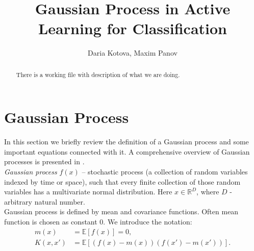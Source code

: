 \documentclass[a4paper]{article}
\title{Gaussian Process in Active Learning for Classification}
\author{Daria Kotova, Maxim Panov}
\begin{document}
\maketitle

\setlength{\marginparwidth}{2cm}

\begin{abstract}

There is a working file with description of what we are doing.

\end{abstract}

\section{Gaussian Process}

In this section we briefly review the definition of a Gaussian process and some important equations connected with it. A comprehensive overview of Gaussian processes is presented in \cite{gp}. \\
{\em  Gaussian process} $f\left(x\right)$ -- stochastic process (a collection of random variables indexed by time or space), such that every finite collection of those random variables has a multivariate normal distribution. Here $x \in \mathbb{R}^D$, where $D$ - arbitrary natural number. \\
Gaussian process is defined by mean and covariance functions. Often mean function is chosen as constant 0. We introduce the notation:
\begin{align*}
m\left(x\right) & = \mathds{E}\left[ f\left(x\right) \right] = 0, \\
K\left(x, x'\right) & = \mathds{E} \left[ \left(f\left(x\right) - m\left(x\right)\right) \left(f\left(x'\right) - m\left(x'\right)\right)\right].
\end{align*}
\end{document}
